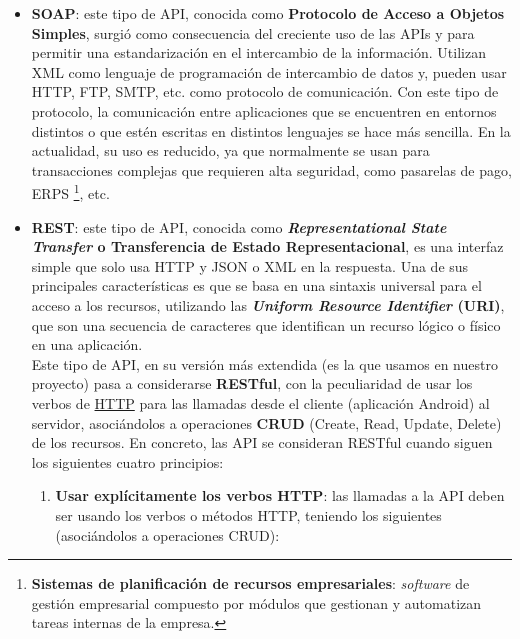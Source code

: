     \begin{itemize}
        \item \textbf{SOAP}: este tipo de API, conocida como \textbf{Protocolo de Acceso a
        Objetos Simples}, surgió como consecuencia del creciente uso de las APIs y para
        permitir una estandarización en el intercambio de la información. Utilizan XML
        como lenguaje de programación de intercambio de datos y, pueden usar HTTP,
        FTP, SMTP, etc. como protocolo de comunicación. Con este tipo de protocolo, la
        comunicación entre aplicaciones que se encuentren en entornos distintos o que estén
        escritas en distintos lenguajes se hace más sencilla. En la actualidad, su uso es
        reducido, ya que normalmente se usan para transacciones complejas que requieren
        alta seguridad, como pasarelas de pago, ERPS \footnote{\textbf{Sistemas de
        planificación de recursos empresariales}: \textit{software} de gestión empresarial
        compuesto por módulos que gestionan y automatizan tareas internas de la empresa.},
        etc.

        \item \textbf{REST}: este tipo de API, conocida como \textbf{\textit{Representational
        State Transfer} o Transferencia de Estado Representacional}, es una interfaz simple
        que solo usa HTTP y JSON o XML en la respuesta. Una de sus principales
        características es que se basa en una sintaxis universal para el acceso a los
        recursos, utilizando las \textbf{\textit{Uniform Resource Identifier} (URI)}, que
        son una secuencia de caracteres que identifican un recurso lógico o físico en una
        aplicación.\\
        
        Este tipo de API, en su versión más extendida (es la que usamos en nuestro proyecto)
        pasa a considerarse \textbf{RESTful}, con la peculiaridad de usar los verbos de
        \href{https://developer.mozilla.org/es/docs/Web/HTTP/Methods}{HTTP} para las
        llamadas desde el cliente (aplicación Android) al servidor, asociándolos a
        operaciones \textbf{CRUD} (Create, Read, Update, Delete) de los recursos. En
        concreto, las API se consideran RESTful cuando siguen los siguientes cuatro
        principios:

            \begin{enumerate}
                \item \textbf{Usar explícitamente los verbos HTTP}: las llamadas a la API
                deben ser usando los verbos o métodos HTTP, teniendo los siguientes
                (asociándolos a operaciones CRUD):
                    

\end{enumerate}
\end{itemize}
